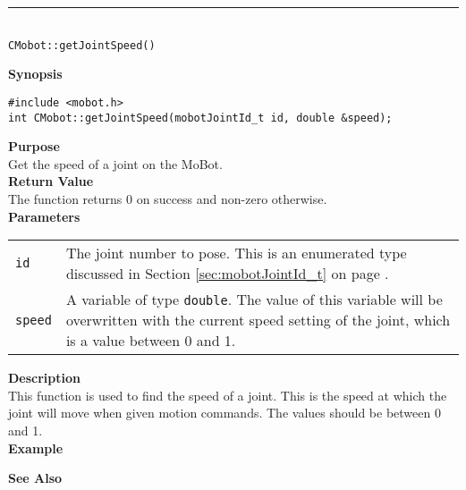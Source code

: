 \noindent
\vspace{5pt}
\rule{4.5in}{0.015in}\\
\noindent
{\LARGE \texttt{CMobot::getJointSpeed()}}\\
{}

\noindent
{\bf Synopsis}\\
\begin{verbatim}
#include <mobot.h>
int CMobot::getJointSpeed(mobotJointId_t id, double &speed);
\end{verbatim}

\noindent
{\bf Purpose}\\
Get the speed of a joint on the MoBot.\\

\noindent
{\bf Return Value}\\
The function returns 0 on success and non-zero otherwise.\\

\noindent
{\bf Parameters}
\vspace{-0.1in}
\begin{description}
\item               
\begin{tabular}{p{10 mm}p{145 mm}}
\texttt{id} & The joint number to pose. This is an enumerated type 
discussed in Section \ref{sec:mobotJointId_t} on page
\pageref{sec:mobotJointId_t}.\\
\texttt{speed} & A variable of type \texttt{double}. The value of this variable
will be overwritten with the current speed setting of the joint, which is a
value between 0 and 1.
\end{tabular}
\end{description}

\noindent
{\bf Description}\\
This function is used to find the speed of a joint.  This is the speed at which the joint will move when given motion commands. The values should be between 0 and 1. \\

\noindent
{\bf Example}\\
\noindent

\noindent
{\bf See Also}\\

